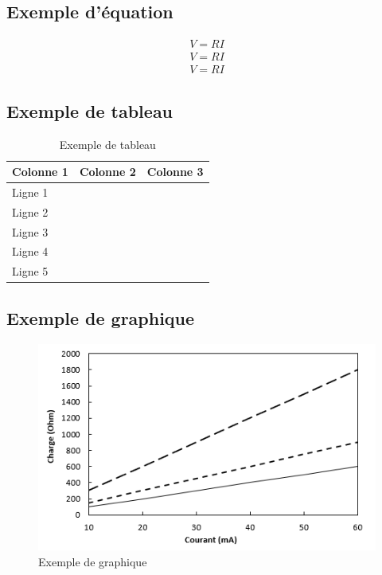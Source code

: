 \subsection{Exemple d'équation}
  \begin{align}
    V = RI \\
    V = RI \\
    V = RI
  \end{align}

\subsection{Exemple de tableau}
  \begin{table}[H]
    \begin{center}
      \caption{Exemple de tableau}
      \begin{tabular}{L{4cm} L{4cm} L{4cm}} 
        \hline
        \textbf{Colonne 1} & \textbf{Colonne 2} & \textbf{Colonne 3} \\ [0.75ex] 
        \hline\hline
        Ligne 1 & & \\
        Ligne 2 & & \\
        Ligne 3 & & \\
        Ligne 4 & & \\
        Ligne 5 & & \\ [1ex]
        \hline
      \end{tabular}
    \end{center}
  \end{table}

\subsection{Exemple de graphique}
  \begin{figure}[H]
    \centering
    \includegraphics[scale=1]{Images/Graph.png}
    \caption{Exemple de graphique}
    \label{fig:Graph}
  \end{figure}

